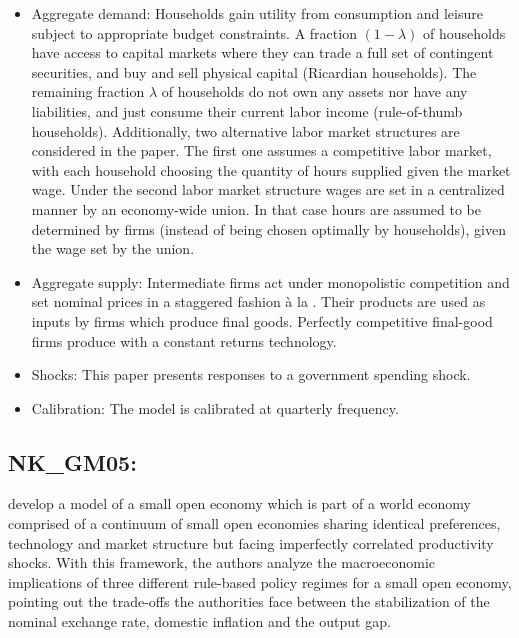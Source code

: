 \documentclass[11pt,a4paper]{article}
\begin{document}
	\begin{itemize}
		\item Aggregate  demand: Households  gain  utility  from  consumption and leisure subject to appropriate budget constraints.  A fraction $(1 - \lambda)$ of households have access to capital markets where they can trade a full set of contingent securities, and buy and sell physical capital (Ricardian households). The remaining fraction $\lambda$ of households do not own any assets nor have any liabilities, and just consume their current labor income (rule-of-thumb households). Additionally, two alternative labor market structures are considered in the paper. The first one assumes a competitive labor market, with each household choosing the quantity of hours supplied given the market wage. Under the second labor market structure wages are set in a centralized manner by an economy-wide union. In that case hours are assumed to be determined by firms (instead of being chosen optimally by households), given the wage set by the union.
		
		\item Aggregate  supply:  Intermediate firms  act  under  monopolistic  competition and set nominal prices in a staggered fashion \`{a} la \cite{Calvo1983}. Their products are used as inputs by firms which produce final goods. Perfectly competitive final-good firms produce with a constant returns technology.
		
		\item Shocks:  This paper presents responses to a government spending shock.
		
		\item Calibration:  The model is calibrated at quarterly frequency.
	\end{itemize}
	
	
	
	\subsection{NK\_GM05: \texorpdfstring{\cite{GaliMonacelli2005}}{GalÃƒÂ­ and Monacelli (2005)}}
	\label{NKGM05}
	\cite{GaliMonacelli2005} develop a model of a small open economy which is part of a world economy comprised of a continuum of small open economies sharing identical preferences, technology and market structure but facing imperfectly correlated productivity shocks. With this framework, the authors analyze the macroeconomic implications of three different rule-based policy regimes for a small open economy, pointing out the trade-offs the authorities face between the stabilization of the nominal exchange rate, domestic inflation and the output gap.
	
\end{document}
